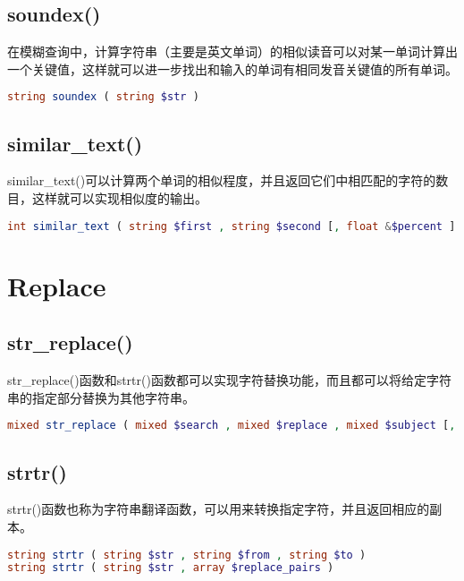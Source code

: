\subsection{soundex()}

在模糊查询中，计算字符串（主要是英文单词）的相似读音可以对某一单词计算出一个关键值，这样就可以进一步找出和输入的单词有相同发音关键值的所有单词。




\begin{lstlisting}[language=PHP]
string soundex ( string $str )
\end{lstlisting}

\subsection{similar\_text()}



similar\_text()可以计算两个单词的相似程度，并且返回它们中相匹配的字符的数目，这样就可以实现相似度的输出。

\begin{lstlisting}[language=PHP]
int similar_text ( string $first , string $second [, float &$percent ] )
\end{lstlisting}

\section{Replace}


\subsection{str\_replace()}

str\_replace()函数和strtr()函数都可以实现字符替换功能，而且都可以将给定字符串的指定部分替换为其他字符串。




\begin{lstlisting}[language=PHP]
mixed str_replace ( mixed $search , mixed $replace , mixed $subject [, int &$count ] )
\end{lstlisting}

\subsection{strtr()}

strtr()函数也称为字符串翻译函数，可以用来转换指定字符，并且返回相应的副本。


\begin{lstlisting}[language=PHP]
string strtr ( string $str , string $from , string $to )
string strtr ( string $str , array $replace_pairs )
\end{lstlisting}



